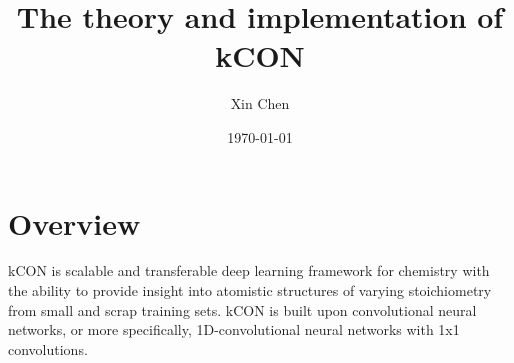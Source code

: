 \documentclass{article}
\title{The theory and implementation of kCON}
\author{Xin Chen}
\date{\today}
\begin{document}
\maketitle


\section{Overview}

kCON is scalable and transferable deep learning framework for chemistry with the ability to 
provide insight into atomistic structures of varying stoichiometry from small and scrap 
training sets. kCON is built upon convolutional neural networks, or more specifically, 
1D-convolutional neural networks with 1x1 convolutions.





\newpage


\end{document}

